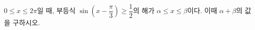 $0\le x\le 2\pi$일 때, 부등식 $\sin\left(x-\dfrac{\pi}{3}\right)\ge\dfrac{1}{2}$의 해가 $\alpha\le x\le\beta$이다. 이때 $\alpha+\beta$의 값을 구하시오.
